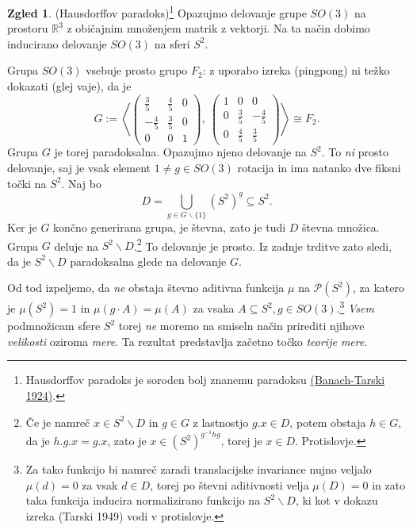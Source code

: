 \documentclass[11pt]{book}
\def\RR{\mathbb{R}}
\def\PP{\mathcal{P}}
\def\literatura{\color{modra}}
\def\vaje{{\literatura (glej vaje)}}
\theoremstyle{definition}
\theoremstyle{zgled}
\newtheorem*{zgled}{Zgled}
\theoremstyle{odprtproblem}
\theoremstyle{domacanaloga}
\theoremstyle{izrek}
\begin{document}
\begin{zgled}(Hausdorffov paradoks)\footnote{Hausdorffov paradoks je soroden bolj znanemu paradoksu \href{http://matwbn.icm.edu.pl/ksiazki/fm/fm6/fm6127.pdf}{(Banach-Tarski 1924)}.}
Opazujmo delovanje grupe $SO(3)$ na prostoru $\RR^3$ z običajnim množenjem matrik z vektorji. Na ta način dobimo inducirano delovanje $SO(3)$ na sferi $S^2$.

Grupa $SO(3)$ vsebuje prosto grupo $F_2$: z uporabo izreka {\sc (pingpong)} ni težko dokazati \vaje, da je
\[
G := \left\langle
\begin{pmatrix}
\frac35 & \frac45 & 0 \\
 -\frac45 & \frac35 & 0 \\
 0 & 0 & 1
\end{pmatrix}, \
\begin{pmatrix}
1 & 0 & 0 \\
0 & \frac35 & -\frac45 \\
0 & \frac45 & \frac35
\end{pmatrix}
\right\rangle \cong F_2.
\]
Grupa $G$ je torej paradoksalna. Opazujmo njeno delovanje na $S^2$. To {\em ni} prosto delovanje, saj je vsak element $1 \neq g \in SO(3)$ rotacija in ima natanko dve fiksni točki na $S^2$. Naj bo
\[
D = \bigcup_{g \in G \backslash \{ 1 \}} (S^2)^g \subseteq S^2.
\]
Ker je $G$ končno generirana grupa, je števna, zato je tudi $D$ števna množica. Grupa $G$ deluje na $S^2 \backslash D$.\footnote{Če je namreč $x \in S^2 \backslash D$ in $g \in G$ z lastnostjo $g.x \in D$, potem obstaja $h \in G$, da je $h.g.x = g.x$, zato je $x \in (S^2)^{g^{-1}hg}$, torej je $x \in D$. Protislovje.} To delovanje je prosto. Iz zadnje trditve zato sledi, da je $S^2 \backslash D$ paradoksalna glede na delovanje $G$.

Od tod izpeljemo, da {\em ne} obstaja števno aditivna funkcija $\mu$ na $\PP(S^2)$, za katero je $\mu(S^2) = 1$ in $\mu(g \cdot A ) = \mu(A)$ za vsaka $A \subseteq S^2, g \in SO(3)$.\footnote{Za tako funkcijo bi namreč zaradi translacijske invariance nujno veljalo $\mu(d) = 0$ za vsak $d \in D$, torej po števni aditivnosti velja $\mu(D) = 0$ in zato taka funkcija inducira normalizirano funkcijo na $S^2 \backslash D$, ki kot v dokazu izreka {\literatura (Tarski 1949)} vodi v protislovje.} {\em Vsem} podmnožicam sfere $S^2$ torej {\em ne} moremo na smiseln način prirediti njihove {\em velikosti} oziroma {\em mere}. Ta rezultat predstavlja začetno točko {\em teorije mere}.
\end{zgled}
\end{document}
